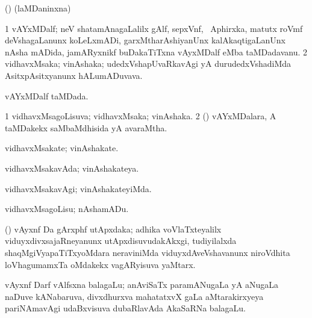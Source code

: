 \bentry
{}
\gl{\saMkiSx}
\expl{}
\bmng
 (\birx) (laMDaninxna)  
\emng
\eentry

\bentry
{} 
\gl{\nA}
\expl{}
\bmng
\bnum
\num{1}  vAYxMDalf; neV shatamAnagaLalilx gAlf, sepxVnf, \kanu\ Aphirxka, matutx roVmf deVshagaLanunx koLeLxmADi, garxMtharAshiyanUnx kalAkaqtigaLanUnx nAsha mADida, jamARyxnikf buDakaTiTxna vAyxMDalf eMba taMDadavanu. 
\num{2} vidhavxMsaka; vinAshaka; udedxVshapUvaRkavAgi yA durudedxVshadiMda AsitxpAsitxyanunx hALumADuvava. 
\enum
\emng
\eentry

\bentry
{} 
\gl{\gu}
\expl{}
\bmng
 vAYxMDalf taMDada. 
\emng
\eentry

\bentry
{} 
\gl{\gu}
\expl{}
\bmng
\bnum
\num{1} vidhavxMsagoLisuva; vidhavxMsaka; vinAshaka. 
\num{2} () vAYxMDalara, A taMDakekx saMbaMdhisida yA avaraMtha. 
\enum
\emng
\eentry

\bentry
{} 
\gl{\nA}
\expl{}
\bmng
 vidhavxMsakate; vinAshakate. 
\emng
\eentry

\bentry
{} 
\gl{\gu}
\expl{}
\bmng
 vidhavxMsakavAda; vinAshakateya. 
\emng
\eentry

\bentry
{} 
\gl{\kirxvi}
\expl{}
\bmng
 vidhavxMsakavAgi; vinAshakateyiMda. 
\emng
\eentry

\bentry
{} 
\gl{\sakirx}
\expl{}
\bmng
 vidhavxMsagoLisu; nAshamADu. 
\emng
\eentry

\bentry
{} 
\gl{\nA}
\expl{}
\bmng
 (\viduyx) vAyxnf Da gArxphf utApxdaka; adhika voVlaTxteyalilx viduyxdivxsajaRneyanunx utApxdisuvudakAkxgi, tudiyilalxda shaqMgiVyapaTiTxyoMdara neraviniMda viduyxdAveVshavanunx niroVdhita  loVhagumamxTa oMdakekx vagARyisuva yaMtarx. 
\emng
\eentry

\bentry
{}
\gl{\nA}
\expl{(\bava) (\ravi)}
\bmng
 vAyxnf Darf vAlfsxna balagaLu; anAviSaTx paramANugaLa yA aNugaLa naDuve kANabaruva, divxdhurxva mahatatxvX  gaLa aMtarakirxyeya pariNAmavAgi udaBxvisuva dubaRlavAda AkaSaRNa balagaLu. 
\emng
\eentry

